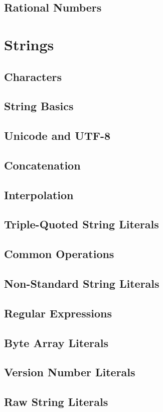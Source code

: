     \section{Rational Numbers}
  \chapter{Strings}
    \section{Characters}
    \section{String Basics}
    \section{Unicode and UTF-8}
    \section{Concatenation}
    \section{Interpolation}
    \section{Triple-Quoted String Literals}
    \section{Common Operations}
    \section{Non-Standard String Literals}
    \section{Regular Expressions}
    \section{Byte Array Literals}
    \section{Version Number Literals}
    \section{Raw String Literals}
